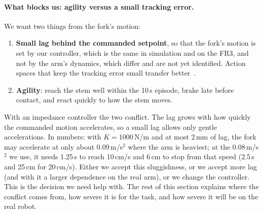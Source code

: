 \paragraph{What blocks us: agility versus a small tracking error.} We want two things from the fork's motion:
\begin{enumerate}
  \item \textbf{Small lag behind the commanded setpoint}, so that the fork's motion is set by our controller, which
        is the same in simulation and on the FR3, and not by the arm's dynamics, which differ and are not yet
        identified. Action spaces that keep the tracking error small transfer better~\cite{al-aljalbout2024}.
  \item \textbf{Agility}: reach the stem well within the 10\,s episode, brake late before contact, and react quickly
        to how the stem moves.
\end{enumerate}
With an impedance controller the two conflict. The lag grows with how quickly the commanded motion accelerates, so
a small lag allows only gentle accelerations. In numbers: with $K = 1000$\,N/m and at most 2\,mm of lag, the fork may
accelerate at only about 0.09\,m/s$^2$ where the arm is heaviest; at the 0.08\,m/s$^2$ we use, it needs 1.25\,s to
reach 10\,cm/s and 6\,cm to stop from that speed (2.5\,s and 25\,cm for 20\,cm/s). Either
we accept this sluggishness, or we accept more lag (and with it a larger dependence on the real arm), or we change
the controller. This is the decision we need help with. The rest of this section explains where the conflict comes
from, how severe it is for the task, and how severe it will be on the real robot.

